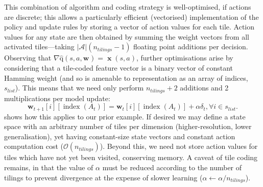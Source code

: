 \documentclass[10pt, times, comsoc]{IEEEtran}
\newcommand{\acval}[3]{\ensuremath{\operatorname{\hat{q}}(#1, #2, #3)}}
\newcommand{\wvec}[1]{\ensuremath{\bm{w}_{#1}}}
\begin{document}
This combination of algorithm and coding strategy is well-optimised, if actions are discrete; this allows a particularly efficient (vectorised) implementation of the policy and update rules by storing a vector of action values for each tile.
Action values for any state are then obtained by summing the weight vectors from all activated tiles---taking $|\mathcal{A}|(n_{\mathit{tilings}}-1)$ floating point additions per decision.
Observing that $\nabla{\acval{s}{a}{\wvec{}}} = \operatorname{\mathbf{x}}(s, a)$, further optimisations arise by considering that a tile-coded feature vector is a binary vector of constant Hamming weight (and so is amenable to representation as an array of indices, $s_{\mathit{list}}$).
This means that we need only perform $n_{\mathit{tilings}} + 2$ additions and \num{2} multiplications per model update:
\begin{equation}
\bm{w}_{t+1}[i][\operatorname{index}(A_t)] = \bm{w}_{t}[i][\operatorname{index}(A_t)] + \alpha \delta_t, \forall i \in s_{\mathit{list}}.
\label{eqn:sg-sarsa-opt}
\end{equation}
 shows how this applies to our prior example.
If desired we may define a state space with an arbitrary number of tiles per dimension (higher-resolution, lower generalisation), yet having constant-size state vectors and constant action computation cost ($\mathcal{O}(n_{\mathit{tilings}})$).
Beyond this, we need not store action values for tiles which have not yet been visited, conserving memory.
A caveat of tile coding remains, in that the value of $\alpha$ must be reduced according to the number of tilings to prevent divergence at the expense of slower learning ($\alpha \leftarrow \alpha / n_{\mathit{tilings}}$).


\end{document}
